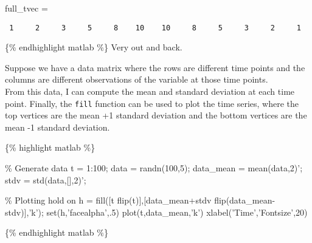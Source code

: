 \documentclass[
]{article}
\begin{document}
full\_tvec =

\begin{verbatim}
 1     2     3     5     8    10    10     8     5     3     2     1
\end{verbatim}

\{\% endhighlight matlab \%\} Very out and back.

Suppose we have a data matrix where the rows are different time points
and the columns are different observations of the variable at those time
points.\\
From this data, I can compute the mean and standard deviation at each
time point. Finally, the \texttt{fill} function can be used to plot the
time series, where the top vertices are the mean +1 standard deviation
and the bottom vertices are the mean -1 standard deviation.

\{\% highlight matlab \%\}

\% Generate data t = 1:100; data = randn(100,5); data\_mean =
mean(data,2)'; stdv = std(data,{[}{]},2)';

\% Plotting hold on h = fill({[}t flip(t){]},{[}data\_mean+stdv
flip(data\_mean-stdv){]},'k'); set(h,'facealpha',.5)
plot(t,data\_mean,'k') xlabel('Time','Fontsize',20)

\{\% endhighlight matlab \%\}
\end{document}
